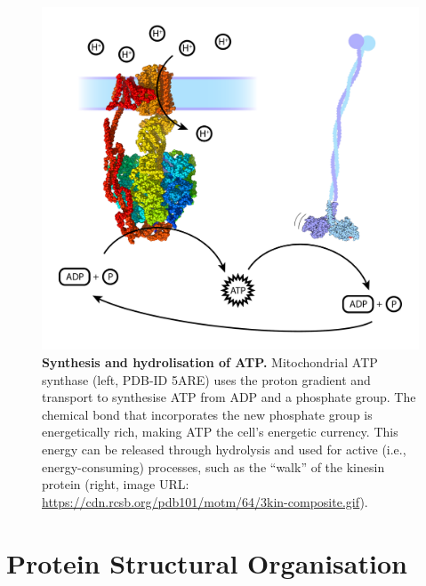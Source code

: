 \begin{figure}[tbh!]
    \centering
    \includegraphics[width=0.8\linewidth]{figures/atp_adp_usage.pdf}
    \caption{\textbf{Synthesis and hydrolisation of ATP.} Mitochondrial ATP synthase (left, PDB-ID 5ARE) uses the \gls{proton} gradient and transport to synthesise ATP from ADP and a phosphate group. The chemical bond that incorporates the new phosphate group is energetically rich, making ATP the cell's energetic currency. This energy can be released through hydrolysis and used for active (i.e., energy-consuming) processes, such as the ``walk'' of the kinesin protein (right, image URL: \url{https://cdn.rcsb.org/pdb101/motm/64/3kin-composite.gif}).}
    \label{fig:chapter1:atp_adp}
\end{figure}


\section{Protein Structural Organisation}

